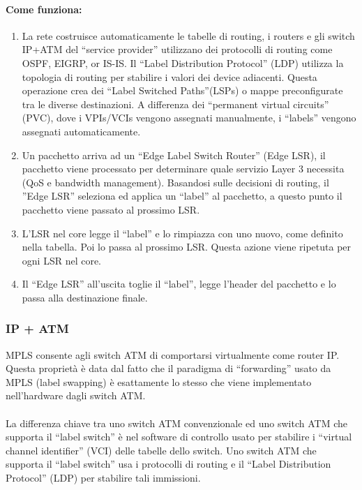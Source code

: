 \documentclass{article}
\begin{document}
\paragraph{Come funziona:}
\noindent
\begin{enumerate}
    \item La rete costruisce automaticamente le tabelle di routing, i routers e gli switch IP+ATM del 
    “service provider” utilizzano dei protocolli di routing come OSPF, EIGRP, or IS-IS. Il “Label 
    Distribution Protocol” (LDP) utilizza la topologia di routing per stabilire i valori dei device 
    adiacenti. Questa operazione crea dei “Label Switched Paths”(LSPs) o mappe  preconfigurate tra le 
    diverse destinazioni. A differenza dei “permanent virtual circuits” (PVC), dove i VPIs/VCIs vengono 
    assegnati manualmente, i “labels” vengono assegnati automaticamente. 
    \item Un pacchetto arriva ad un “Edge Label Switch Router” (Edge LSR), il pacchetto viene processato 
    per determinare quale servizio Layer 3 necessita (QoS e bandwidth management). Basandosi sulle 
    decisioni di routing, il ”Edge LSR” seleziona ed applica un “label” al pacchetto, a questo punto 
    il pacchetto viene passato al prossimo LSR. 
    \item L’LSR nel core legge il “label” e lo rimpiazza con uno nuovo, come definito nella tabella. 
    Poi lo passa al prossimo LSR. Questa azione viene ripetuta per ogni LSR nel core.
    \item Il “Edge LSR” all’uscita toglie il “label”, legge l’header del pacchetto e lo passa 
    alla destinazione finale. 
\end{enumerate}
\subsubsection{IP + ATM}
MPLS consente agli switch ATM di comportarsi virtualmente come router IP. Questa proprietà è data dal fatto 
che il paradigma di “forwarding” usato da MPLS (label swapping) è esattamente lo stesso che viene 
implementato nell’hardware dagli switch ATM.\\\\
La differenza chiave tra uno switch ATM convenzionale ed uno switch ATM che supporta il “label switch” è 
nel software di controllo usato per stabilire i “virtual channel identifier” (VCI) delle tabelle dello 
switch. Uno switch ATM che supporta il “label switch” usa i protocolli di routing e il “Label Distribution 
Protocol” (LDP) per stabilire tali immissioni. 
\end{document}

